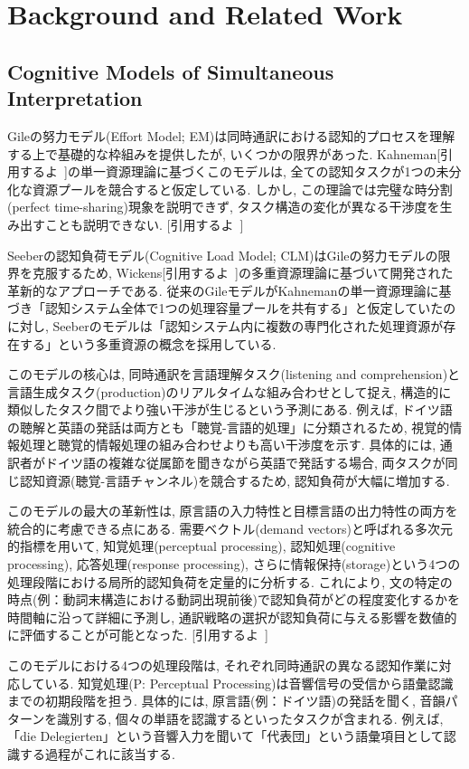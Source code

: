 \section{Background and Related Work}

\subsection{Cognitive Models of Simultaneous Interpretation}

Gileの努力モデル(Effort Model; EM)は同時通訳における認知的プロセスを理解する上で基礎的な枠組みを提供したが, いくつかの限界があった.
Kahneman[引用するよ~]の単一資源理論に基づくこのモデルは, 全ての認知タスクが1つの未分化な資源プールを競合すると仮定している.
しかし, この理論では完璧な時分割(perfect time-sharing)現象を説明できず, タスク構造の変化が異なる干渉度を生み出すことも説明できない.
[引用するよ~]

Seeberの認知負荷モデル(Cognitive Load Model; CLM)はGileの努力モデルの限界を克服するため, Wickens[引用するよ~]の多重資源理論に基づいて開発された革新的なアプローチである.
従来のGileモデルがKahnemanの単一資源理論に基づき「認知システム全体で1つの処理容量プールを共有する」と仮定していたのに対し, Seeberのモデルは「認知システム内に複数の専門化された処理資源が存在する」という多重資源の概念を採用している.

このモデルの核心は, 同時通訳を言語理解タスク(listening and comprehension)と言語生成タスク(production)のリアルタイムな組み合わせとして捉え, 構造的に類似したタスク間でより強い干渉が生じるという予測にある.
例えば, ドイツ語の聴解と英語の発話は両方とも「聴覚-言語的処理」に分類されるため, 視覚的情報処理と聴覚的情報処理の組み合わせよりも高い干渉度を示す.
具体的には, 通訳者がドイツ語の複雑な従属節を聞きながら英語で発話する場合, 両タスクが同じ認知資源(聴覚-言語チャンネル)を競合するため, 認知負荷が大幅に増加する.

このモデルの最大の革新性は, 原言語の入力特性と目標言語の出力特性の両方を統合的に考慮できる点にある.
需要ベクトル(demand vectors)と呼ばれる多次元的指標を用いて, 知覚処理(perceptual processing), 認知処理(cognitive processing), 応答処理(response processing), さらに情報保持(storage)という4つの処理段階における局所的認知負荷を定量的に分析する.
これにより, 文の特定の時点(例：動詞末構造における動詞出現前後)で認知負荷がどの程度変化するかを時間軸に沿って詳細に予測し, 通訳戦略の選択が認知負荷に与える影響を数値的に評価することが可能となった.
[引用するよ~]

このモデルにおける4つの処理段階は, それぞれ同時通訳の異なる認知作業に対応している.
知覚処理(P: Perceptual Processing)は音響信号の受信から語彙認識までの初期段階を担う.
具体的には, 原言語(例：ドイツ語)の発話を聞く, 音韻パターンを識別する, 個々の単語を認識するといったタスクが含まれる.
例えば, 「die Delegierten」という音響入力を聞いて「代表団」という語彙項目として認識する過程がこれに該当する.

